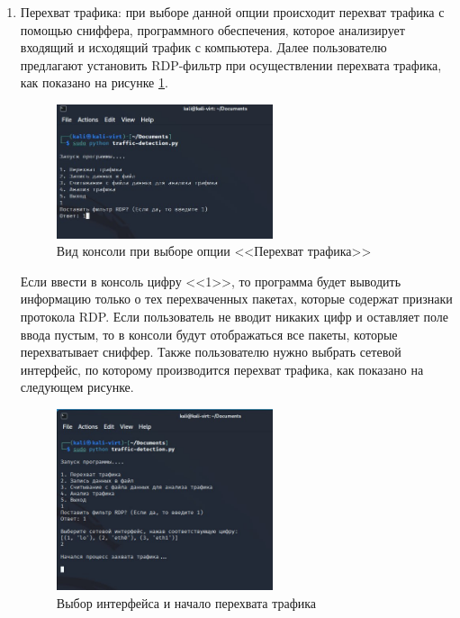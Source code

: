 \documentclass[bachelor, och, coursework]{SCWorks}
\begin{document}
\begin{enumerate}
  \item Перехват трафика: при выборе данной опции происходит перехват трафика с помощью сниффера, программного обеспечения, которое анализирует входящий
  и исходящий трафик с компьютера. Далее пользователю предлагают установить RDP-фильтр при осуществлении перехвата трафика, как показано на рисунке 
  \ref{cmd-filter}.
  
  \begin{figure}[H]
    \centering
    \includegraphics[width=0.6\textwidth]{photo/cmd-filter.jpg}
    \caption{Вид консоли при выборе опции <<Перехват трафика>>}
    \label{cmd-filter}
  \end{figure}

  Если ввести в консоль цифру <<1>>, то программа будет выводить информацию только о тех перехваченных пакетах, которые содержат признаки протокола RDP. 
  Если пользователь не вводит никаких цифр и оставляет поле ввода пустым, то в консоли будут отображаться все пакеты, которые перехватывает сниффер.
  Также пользователю нужно выбрать сетевой интерфейс, по которому производится перехват трафика, как показано на следующем рисунке.


  \begin{figure}[H]
    \centering
    \includegraphics[width=0.6\textwidth]{photo/cmd-start.jpg}
    \caption{Выбор интерфейса и начало перехвата трафика}
    \label{cmd-start}
  \end{figure}



\end{enumerate}
\end{document}
